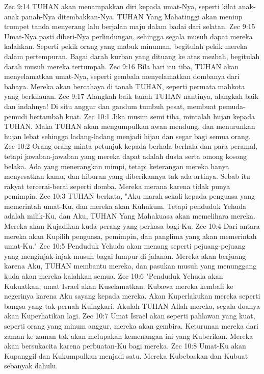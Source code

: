 Zec 9:14  TUHAN akan menampakkan diri kepada umat-Nya, seperti kilat anak-anak panah-Nya ditembakkan-Nya. TUHAN Yang Mahatinggi akan meniup trompet tanda menyerang lalu berjalan maju dalam badai dari selatan.
Zec 9:15  Umat-Nya pasti diberi-Nya perlindungan, sehingga segala musuh dapat mereka kalahkan. Seperti pekik orang yang mabuk minuman, begitulah pekik mereka dalam pertempuran. Bagai darah kurban yang dituang ke atas mezbah, begitulah darah musuh mereka tertumpah.
Zec 9:16  Bila hari itu tiba, TUHAN akan menyelamatkan umat-Nya, seperti gembala menyelamatkan dombanya dari bahaya. Mereka akan bercahaya di tanah TUHAN, seperti permata mahkota yang berkilauan.
Zec 9:17  Alangkah baik tanah TUHAN nantinya, alangkah baik dan indahnya! Di situ anggur dan gandum tumbuh pesat, membuat pemuda-pemudi bertambah kuat.
Zec 10:1  Jika musim semi tiba, mintalah hujan kepada TUHAN. Maka TUHAN akan mengumpulkan awan mendung, dan menurunkan hujan lebat sehingga ladang-ladang menjadi hijau dan segar bagi semua orang.
Zec 10:2  Orang-orang minta petunjuk kepada berhala-berhala dan para peramal, tetapi jawaban-jawaban yang mereka dapat adalah dusta serta omong kosong belaka. Ada yang menerangkan mimpi, tetapi keterangan mereka hanya menyesatkan kamu, dan hiburan yang diberikannya tak ada artinya. Sebab itu rakyat tercerai-berai seperti domba. Mereka merana karena tidak punya pemimpin.
Zec 10:3  TUHAN berkata, "Aku marah sekali kepada penguasa yang memerintah umat-Ku, dan mereka akan Kuhukum. Tetapi penduduk Yehuda adalah milik-Ku, dan Aku, TUHAN Yang Mahakuasa akan memelihara mereka. Mereka akan Kujadikan kuda perang yang perkasa bagi-Ku.
Zec 10:4  Dari antara mereka akan Kupilih penguasa, pemimpin, dan panglima yang akan memerintah umat-Ku."
Zec 10:5  Penduduk Yehuda akan menang seperti pejuang-pejuang yang menginjak-injak musuh bagai lumpur di jalanan. Mereka akan berjuang karena Aku, TUHAN membantu mereka, dan pasukan musuh yang menunggang kuda akan mereka kalahkan semua.
Zec 10:6  "Penduduk Yehuda akan Kukuatkan, umat Israel akan Kuselamatkan. Kubawa mereka kembali ke negerinya karena Aku sayang kepada mereka. Akan Kuperlakukan mereka seperti bangsa yang tak pernah Kuingkari. Akulah TUHAN Allah mereka, segala doanya akan Kuperhatikan lagi.
Zec 10:7  Umat Israel akan seperti pahlawan yang kuat, seperti orang yang minum anggur, mereka akan gembira. Keturunan mereka dari zaman ke zaman tak akan melupakan kemenangan ini yang Kuberikan. Mereka akan bersukacita karena perbuatan-Ku bagi mereka.
Zec 10:8  Umat-Ku akan Kupanggil dan Kukumpulkan menjadi satu. Mereka Kubebaskan dan Kubuat sebanyak dahulu.
